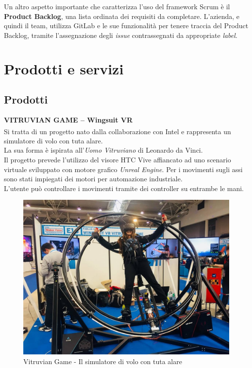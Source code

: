 \noindent Un altro aspetto importante che caratterizza l'uso del framework Scrum è il \textbf{Product Backlog}, una lista ordinata dei requisiti da completare. L'azienda, e quindi il team, utilizza GitLab e le sue funzionalità per tenere traccia del Product Backlog, tramite l'assegnazione degli \textit{issue} contrassegnati da appropriate \textit{label}.

\section{Prodotti e servizi}
\subsection{Prodotti}
\textbf{VITRUVIAN GAME – Wingsuit VR}
\\
Si tratta di un progetto nato dalla collaborazione con Intel\textsuperscript{\textregistered} e rappresenta un simulatore di volo con tuta alare.\\
La sua forma è ispirata all'\textit{Uomo Vitruviano} di Leonardo da Vinci.\\
Il progetto prevede l'utilizzo del visore HTC Vive affiancato ad uno scenario virtuale sviluppato con motore grafico \textit{Unreal Engine}. Per i movimenti sugli assi sono stati impiegati dei motori per automazione industriale.\\
L'utente può controllare i movimenti tramite dei controller su entrambe le mani.
\\
\begin{figure}[H]
	\begin{center}
	\includegraphics[scale=0.15]{immagini/vitruvian.jpg}
	\caption{Vitruvian Game - Il simulatore di volo con tuta alare}
	\end{center}
\end{figure}

